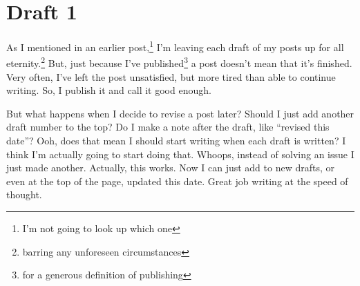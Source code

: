 \documentclass[12pt]{article}[titlepage]
\newcommand{\say}[1]{``#1''}
\newcommand{\1}{\={a}}
\newcommand{\2}{\={e}}
\newcommand{\3}{\={\i}}
\newcommand{\4}{\=o}
\newcommand{\5}{\=u}
\newcommand{\6}{\={A}}
\renewcommand{\,}{\textsuperscript{,}}
\begin{document}
\section{Draft 1}
As I mentioned in an earlier post,\footnote{I'm not going to look up which one} I'm leaving each draft of my posts up for all eternity.\footnote{barring any unforeseen circumstances}
But, just because I've published\footnote{for a generous definition of publishing} a post doesn't mean that it's finished.
Very often, I've left the post unsatisfied, but more tired than able to continue writing.
So, I publish it and call it good enough.

But what happens when I decide to revise a post later?
Should I just add another draft number to the top?
Do I make a note after the draft, like \say{revised this date}?
Ooh, does that mean I should start writing when each draft is written?
I think I'm actually going to start doing that.
Whoops, instead of solving an issue I just made another.
Actually, this works.
Now I can just add to new drafts, or even at the top of the page, updated this date.
Great job writing at the speed of thought.
\end{document}

